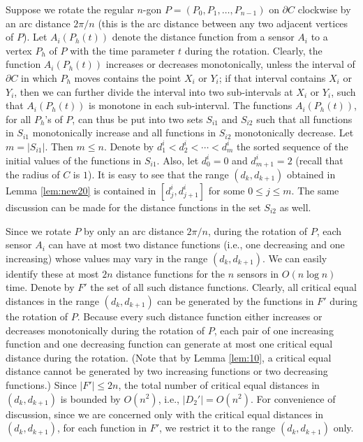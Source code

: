\documentclass[11pt]{article}
\begin{document}
Suppose we rotate the regular $n$-gon $P=(P_0,P_1,\ldots,P_{n-1})$ on
$\partial C$ clockwise by an arc distance $2\pi/n$ (this is the arc
distance between any two adjacent vertices of $P$). Let
$A_i(P_h(t))$ denote the distance function from a sensor $A_i$ to a
vertex $P_h$ of $P$ with the time parameter $t$ during
the rotation. Clearly, the function $A_i(P_h(t))$ increases or
decreases monotonically, unless the interval of $\partial C$ in
which $P_h$ moves contains the point $X_i$ or $Y_i$; if that interval
contains $X_i$ or $Y_i$, then we can further divide the interval
into two sub-intervals at $X_i$ or $Y_i$, such that
$A_i(P_h(t))$ is monotone in each sub-interval.
The functions $A_i(P_h(t))$, for all $P_h$'s of $P$, can thus be
put into two sets $S_{i1}$ and $S_{i2}$ such that all functions
in $S_{i1}$ monotonically increase and all functions in $S_{i2}$
monotonically decrease. Let $m=|S_{i1}|$. Then $m\leq n$. Denote by
$d^{i}_1 < d^{i}_2 < \cdots <d^{i}_m$ the sorted sequence of the
initial values of the functions in $S_{i1}$. Also, let $d^{i}_0=0$
and $d^{i}_{m+1}=2$ (recall that the radius of $C$ is $1$).  It is
easy to see that the range $(d_k, d_{k+1})$ obtained in Lemma \ref{lem:new20}
is contained in $[d^i_j, d^i_{j+1}]$ for some $0\leq j \leq m$.
The same discussion can be made for the distance functions in the
set $S_{i2}$ as well.


Since we rotate $P$ by only an arc distance $2\pi/n$, during the
rotation of $P$, each sensor $A_i$ can have at most two distance
functions (i.e., one decreasing and one increasing) whose values may
vary in the range $(d_k, d_{k+1})$. We can easily identify these at
most $2n$ distance functions for the $n$ sensors in $O(n\log n)$
time. Denote by $F'$ the set of all such distance functions.
Clearly, all critical equal distances in the range $(d_k,d_{k+1})$ can be
generated by the functions in $F'$ during the rotation of $P$. Because every
such distance function either increases or decreases monotonically
during the rotation of $P$, each pair of one increasing function and
one decreasing function can generate at most one critical equal distance
during the rotation. (Note that by Lemma \ref{lem:10}, a
critical equal distance cannot be generated by two increasing functions or
two decreasing functions.) Since $|F'|\leq 2n$, the total number of
critical equal distances in $(d_k,d_{k+1})$ is bounded by $O(n^2)$, i.e.,
$|D_2'|=O(n^2)$. For convenience of discussion, since we are
concerned only with the critical equal distances in $(d_k,d_{k+1})$, for each
function in $F'$, we restrict it to the range $(d_k,d_{k+1})$ only.
\end{document}
